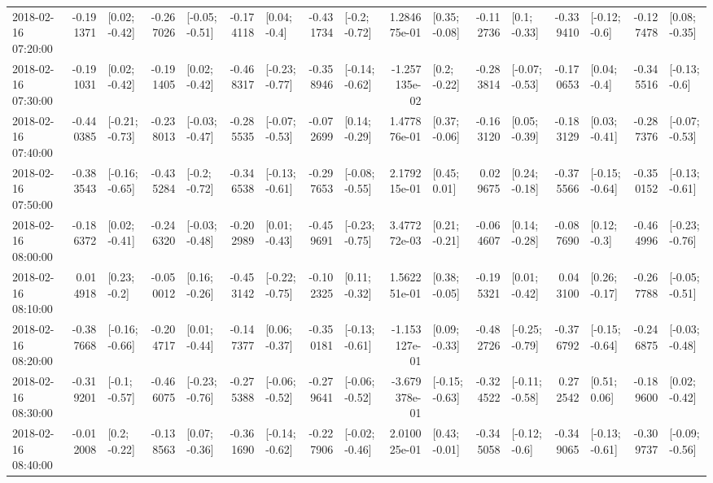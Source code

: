 \begin{tabular}{lrlrlrlrlrlrlrlrl}
2018-02-16 07:20:00 & -0.191371 &   [0.02; -0.42] & -0.267026 &  [-0.05; -0.51] & -0.174118 &    [0.04; -0.4] & -0.431734 &   [-0.2; -0.72] &  1.284675e-01 &   [0.35; -0.08] & -0.112736 &    [0.1; -0.33] & -0.339410 &   [-0.12; -0.6] & -0.127478 &   [0.08; -0.35] \\
2018-02-16 07:30:00 & -0.191031 &   [0.02; -0.42] & -0.191405 &   [0.02; -0.42] & -0.468317 &  [-0.23; -0.77] & -0.358946 &  [-0.14; -0.62] & -1.257135e-02 &    [0.2; -0.22] & -0.283814 &  [-0.07; -0.53] & -0.170653 &    [0.04; -0.4] & -0.345516 &   [-0.13; -0.6] \\
2018-02-16 07:40:00 & -0.440385 &  [-0.21; -0.73] & -0.238013 &  [-0.03; -0.47] & -0.285535 &  [-0.07; -0.53] & -0.072699 &   [0.14; -0.29] &  1.477876e-01 &   [0.37; -0.06] & -0.163120 &   [0.05; -0.39] & -0.183129 &   [0.03; -0.41] & -0.287376 &  [-0.07; -0.53] \\
2018-02-16 07:50:00 & -0.383543 &  [-0.16; -0.65] & -0.435284 &   [-0.2; -0.72] & -0.346538 &  [-0.13; -0.61] & -0.297653 &  [-0.08; -0.55] &  2.179215e-01 &    [0.45; 0.01] &  0.029675 &   [0.24; -0.18] & -0.375566 &  [-0.15; -0.64] & -0.350152 &  [-0.13; -0.61] \\
2018-02-16 08:00:00 & -0.186372 &   [0.02; -0.41] & -0.246320 &  [-0.03; -0.48] & -0.202989 &   [0.01; -0.43] & -0.459691 &  [-0.23; -0.75] &  3.477272e-03 &   [0.21; -0.21] & -0.064607 &   [0.14; -0.28] & -0.087690 &    [0.12; -0.3] & -0.464996 &  [-0.23; -0.76] \\
2018-02-16 08:10:00 &  0.014918 &    [0.23; -0.2] & -0.050012 &   [0.16; -0.26] & -0.453142 &  [-0.22; -0.75] & -0.102325 &   [0.11; -0.32] &  1.562251e-01 &   [0.38; -0.05] & -0.195321 &   [0.01; -0.42] &  0.043100 &   [0.26; -0.17] & -0.267788 &  [-0.05; -0.51] \\
2018-02-16 08:20:00 & -0.387668 &  [-0.16; -0.66] & -0.204717 &   [0.01; -0.44] & -0.147377 &   [0.06; -0.37] & -0.350181 &  [-0.13; -0.61] & -1.153127e-01 &   [0.09; -0.33] & -0.482726 &  [-0.25; -0.79] & -0.376792 &  [-0.15; -0.64] & -0.246875 &  [-0.03; -0.48] \\
2018-02-16 08:30:00 & -0.319201 &   [-0.1; -0.57] & -0.466075 &  [-0.23; -0.76] & -0.275388 &  [-0.06; -0.52] & -0.279641 &  [-0.06; -0.52] & -3.679378e-01 &  [-0.15; -0.63] & -0.324522 &  [-0.11; -0.58] &  0.272542 &    [0.51; 0.06] & -0.189600 &   [0.02; -0.42] \\
2018-02-16 08:40:00 & -0.012008 &    [0.2; -0.22] & -0.138563 &   [0.07; -0.36] & -0.361690 &  [-0.14; -0.62] & -0.227906 &  [-0.02; -0.46] &  2.010025e-01 &   [0.43; -0.01] & -0.345058 &   [-0.12; -0.6] & -0.349065 &  [-0.13; -0.61] & -0.309737 &  [-0.09; -0.56] \\

\end{tabular}
